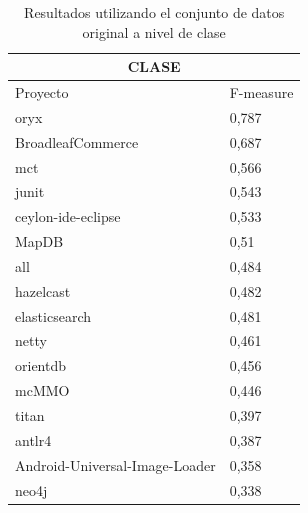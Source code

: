 \begin{table}[H]
 \captionsetup{labelsep=period, labelfont=bf}
\caption{\label{table:original_result_weka_class_result} Resultados utilizando el conjunto de datos original a nivel de clase}
\centering
{
\fontsize{12pt}{10pt}\selectfont
\begin{tabular}{ll}
\toprule 
\multicolumn{2}{c}{CLASE} \\
\midrule 
Proyecto                        & F-measure \\
\hline 
oryx                           & 0,787     \\
BroadleafCommerce              & 0,687     \\
mct                            & 0,566     \\
junit                          & 0,543     \\
ceylon-ide-eclipse             & 0,533     \\
MapDB                          & 0,51      \\
all                            & 0,484     \\
hazelcast                      & 0,482     \\
elasticsearch                  & 0,481     \\
netty                          & 0,461     \\
orientdb                       & 0,456     \\
mcMMO                          & 0,446     \\
titan                          & 0,397     \\
antlr4                         & 0,387     \\
Android-Universal-Image-Loader & 0,358     \\
neo4j                          & 0,338    \\
\bottomrule
\end{tabular}
}

\end{table}
